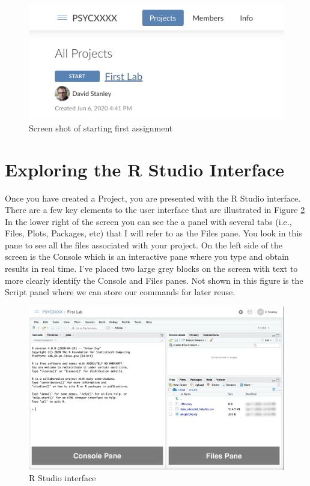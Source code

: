 \documentclass[
]{krantz}
\begin{document}
\begin{figure}
\includegraphics[width=0.7\linewidth]{ch_first_time/images/screenshot_assignment} \caption{Screen shot of starting first assignment}\label{fig:assignment}
\end{figure}

\hypertarget{exploring-the-r-studio-interface}{%
\section{Exploring the R Studio Interface}\label{exploring-the-r-studio-interface}}

Once you have created a Project, you are presented with the R Studio interface. There are a few key elements to the user interface that are illustrated in Figure \ref{fig:interface} In the lower right of the screen you can see the a panel with several tabs (i.e., Files, Plots, Packages, etc) that I will refer to as the Files pane. You look in this pane to see all the files associated with your project. On the left side of the screen is the Console which is an interactive pane where you type and obtain results in real time. I've placed two large grey blocks on the screen with text to more clearly identify the Console and Files panes. Not shown in this figure is the Script panel where we can store our commands for later reuse.

\begin{figure}
\includegraphics[width=0.7\linewidth]{ch_first_time/images/screenshot_interface} \caption{R Studio interface}\label{fig:interface}
\end{figure}
\end{document}
